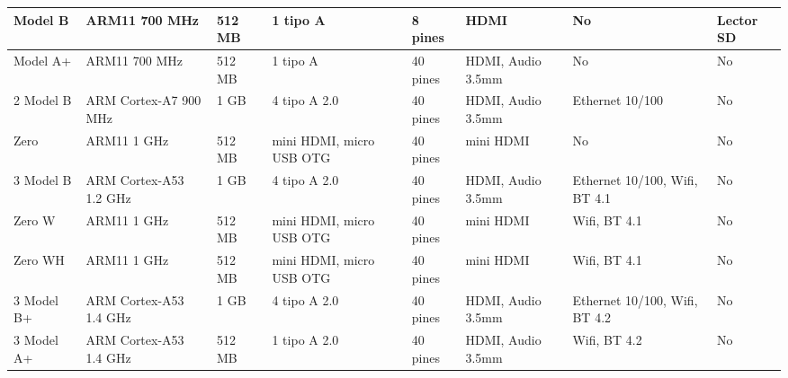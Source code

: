 {\begin{longtable}{|p{1.8cm}|p{2.8cm}|p{1.2cm}|p{1.5cm}|p{1.5cm}|p{2.0cm}|p{2.0cm}|p{2.0cm}|}
        \hline
        \endlastfoot
            Model B                          & ARM11 700 MHz                 & 512 MB          & 1 tipo A                   & 8 pines           & HDMI                     & No                             & Lector SD                       \\ \hline
            Model A+                         & ARM11 700 MHz                 & 512 MB          & 1 tipo A                   & 40 pines          & HDMI, Audio 3.5mm        & No                             & No                              \\ \hline
            2 Model B                        & ARM Cortex-A7 900 MHz         & 1 GB            & 4 tipo A 2.0               & 40 pines          & HDMI, Audio 3.5mm        & Ethernet 10/100                & No                              \\ \hline
            Zero                             & ARM11 1 GHz                   & 512 MB          & mini HDMI, micro USB OTG   & 40 pines          & mini HDMI                & No                             & No                              \\ \hline
            3 Model B                        & ARM Cortex-A53 1.2 GHz        & 1 GB            & 4 tipo A 2.0               & 40 pines          & HDMI, Audio 3.5mm        & Ethernet 10/100, Wifi, BT 4.1  & No                              \\ \hline
            Zero W                           & ARM11 1 GHz                   & 512 MB          & mini HDMI, micro USB OTG   & 40 pines          & mini HDMI                & Wifi, BT 4.1                  & No                              \\ \hline
            Zero WH                          & ARM11 1 GHz                   & 512 MB          & mini HDMI, micro USB OTG   & 40 pines          & mini HDMI                & Wifi, BT 4.1                  & No                              \\ \hline
            3 Model B+                       & ARM Cortex-A53 1.4 GHz        & 1 GB            & 4 tipo A 2.0               & 40 pines          & HDMI, Audio 3.5mm        & Ethernet 10/100, Wifi, BT 4.2  & No                              \\ \hline
            3 Model A+                       & ARM Cortex-A53 1.4 GHz        & 512 MB          & 1 tipo A 2.0               & 40 pines          & HDMI, Audio 3.5mm        & Wifi, BT 4.2                  & No                              \\ \hline

\end{longtable}}
